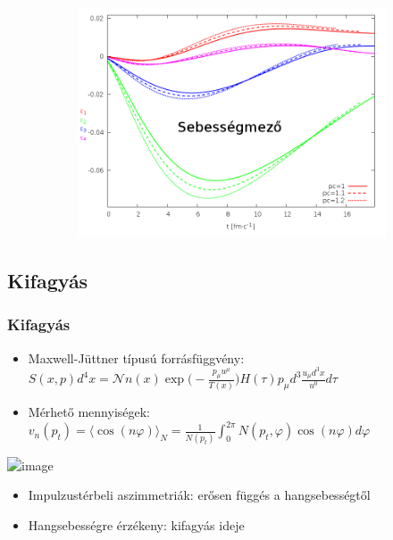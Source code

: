 \documentclass{beamer}
\begin{document}
\begin{frame}
\begin{center}
\begin{figure}[H]
\begin{subfigure}[b]{0.49\textwidth}
        	\includegraphics[width=\textwidth]{pic/res/rel/eps_pc_v}
	\end{subfigure}
\end{figure}
\end{center}
\end{frame}

\subsection{Kifagyás}
\begin{frame}
\frametitle{Kifagyás}
\begin{itemize}
\item<1-> Maxwell-Jüttner típusú forrásfüggvény: 
$S(x, p)d^4x=\mathcal{N}n(x)\exp{\bigg(-\frac{p_\mu u^\mu}{T(x)}\bigg)}H(\tau)p_\mu d^3\frac{u_\mu d^3x}{u^0} d\tau$
\item<2-> Mérhető mennyiségek:
$v_n(p_t)=\langle\cos(n\varphi)\rangle_{N}=\frac{1}{N(p_t)}\int_0^{2\pi} N(p_t, \varphi)\cos(n\varphi)d\varphi$
\end{itemize}
\begin{minipage}{0.49\textwidth}
\begin{center}
\includegraphics<2->[scale=0.23]{pic/res/rel/vn_kappa}
\end{center}
\end{minipage}
\begin{minipage}{0.5\textwidth}
\begin{itemize}
\item<2-> Impulzustérbeli aszimmetriák: erősen függés a hangsebességtől
\item<2-> Hangsebességre érzékeny: kifagyás ideje
\end{itemize}
\end{minipage}
\end{frame}
\end{document}
